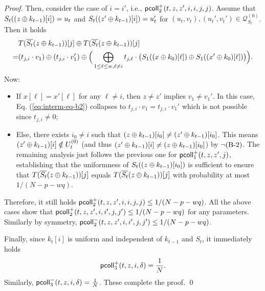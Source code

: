 \begin{proof}
	
	Then, consider the case of $i=i'$, i.e., $\mathsf{pcoll}_{2}^+(t,z,z',i,i,j,j)$. Assume that $S_t((z\oplus k_{t-1})[i])=u_t$ and $S_t((z'\oplus k_{t-1})[i])=u_t'$ for $(u_t,v_t),(u_t',v_t')\in\mathcal{Q}_{S_t}^{(0)}$. Then it holds      {\small
		\begin{align}
		&   T(\overline{S_t}(z\oplus k_{t-1}))[j]\oplus T(\overline{S_t}(z\oplus k_{t-1}))[j]        \notag   \\
		= &
		(t_{j,i}\cdot v_1)
		\oplus
		(t_{j,i}\cdot v_1')
		\oplus
		\Big(\bigoplus_{1\leq\ell\leq w,\ell\neq i}t_{j,\ell}\cdot
		\big(S_1((x\oplus k_0)[\ell])\oplus S_1((x'\oplus k_0)[\ell])\big)\Big)    .
		\label{eq:interm-eq-b2}
		\end{align}
	}%
	Now:
	\begin{itemize}
		\item If $x[\ell]=x'[\ell]$ for any $\ell\neq i$, then $z\neq z'$ implies $v_1\neq v_1'$. In this case, Eq. (\ref{eq:interm-eq-b2}) collapses to $t_{j,i}\cdot v_1=t_{j,i}\cdot v_1'$ which is not possible since $t_{j,i}\neq 0$;
		\item Else, there exists $i_0\neq i$ such that $(z\oplus k_{t-1})[i_0]\neq(z'\oplus k_{t-1})[i_0]$. This means $(z'\oplus k_{t-1})[i]\notin U_t^{(0)}$ (and thus $(z'\oplus k_{t-1})[i]\neq(z\oplus k_{t-1})[i_0]$) by $\neg\text{(B-2)}$. The remaining analysis just follows the previous one for $\mathsf{pcoll}_{1}^+(t,z,z',j)$, establishing that the uniformness of $S_t((z\oplus k_{t-1})[i_0])$ is sufficient to ensure that $T(\overline{S_t}(z\oplus k_{t-1}))[j]$ equals $T(\overline{S_t}(z\oplus k_{t-1}))[j]$ with probability at most $1/(N-p-wq)$.
	\end{itemize}
	Therefore, it still holds $\mathsf{pcoll}_{2}^+(t,z,z',i,i,j,j)\leq1/(N-p-wq)$. All the above cases show that $\mathsf{pcoll}_{2}^+(t,z,z',i,i',j,j')\leq1/(N-p-wq)$ for any parameters. Similarly by symmetry, $\mathsf{pcoll}_{2}^-(t,z,z',i,i',j,j')\leq1/(N-p-wq)$.
	
	
	\arrangespace
	
	
	
	Finally, since $k_t[i]$ is uniform and independent of $k_{t-1}$ and $S_t$, it immediately holds
	$$\mathsf{pcoll}_{3}^+(t,z,i,\delta)=\frac{1}{N}.$$
	Similarly, $\mathsf{pcoll}_{3}^-(t,z,i,\delta)=\frac{1}{N}$. These complete the proof.     \qed
\end{proof}





